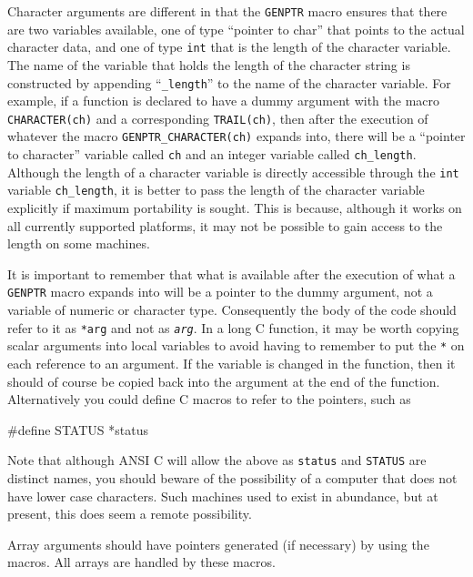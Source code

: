 \documentclass[twoside,11pt,nolof]{starlink}
\begin{document}
Character arguments are different in that the \texttt{GENPTR} macro ensures that
there are two variables available, one of type ``pointer to char'' that points
to the actual character data, and one of type \texttt{int} that is the length
of the character variable.
The name of the variable that holds the length of the
character string is constructed by appending ``\texttt{\_length}'' to the name
of the character variable.
For example, if a function is declared to have a dummy
argument with the macro \texttt{CHARACTER(ch)} and a corresponding
\texttt{TRAIL(ch)}, then after the execution of whatever the macro
\texttt{GENPTR\_CHARACTER(ch)} expands into, there will be a ``pointer to
character'' variable called \texttt{ch} and an integer variable called
\texttt{ch\_length}.
Although the length of a character variable is directly accessible through the
\texttt{int} variable \texttt{ch\_length}, it is better to pass the length of
the character variable explicitly if maximum portability is sought. This is
because, although it works on all currently supported platforms, it may not be
possible to gain access to the length on some machines.

It is important to remember that what is available after the execution of what
a \texttt{GENPTR} macro expands into will be a pointer to the dummy argument,
not a variable of numeric or character type. Consequently the body of the code
should refer to it as \texttt{*\texttt{arg}}\/ and not as
\texttt{\textit{arg}}.
In a long C function, it
may be worth copying scalar arguments into local variables to avoid having to
remember to put the \texttt{*} on each reference to an argument. If the variable
is changed in the function, then it should of course be copied back into the
argument at the end of the function. Alternatively you could define C macros to
refer to the pointers, such as

\begin{terminalv}
#define STATUS *status
\end{terminalv}

Note that although ANSI C will allow the above as \texttt{status} and
\texttt{STATUS}
are distinct names, you should beware of the possibility of a computer that
does not have lower case characters. Such machines used to exist in abundance,
but at present, this does seem a remote possibility.

Array arguments should have pointers generated (if necessary) by using the
macros. All arrays are handled by these macros.
\end{document}

